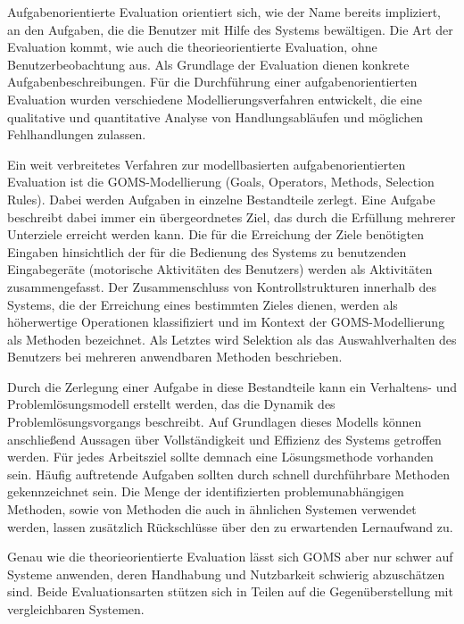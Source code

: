 Aufgabenorientierte Evaluation orientiert sich, wie der Name bereits impliziert, an den Aufgaben, die die Benutzer mit Hilfe des Systems bewältigen. Die Art der Evaluation kommt, wie auch die theorieorientierte Evaluation, ohne Benutzerbeobachtung aus. Als Grundlage der Evaluation dienen konkrete Aufgabenbeschreibungen. Für die Durchführung einer aufgabenorientierten Evaluation wurden verschiedene Modellierungsverfahren entwickelt, die eine qualitative und quantitative Analyse von Handlungsabläufen und möglichen Fehlhandlungen zulassen. \parencite[vgl.][209]{Herczeg2009}

Ein weit verbreitetes Verfahren zur modellbasierten aufgabenorientierten Evaluation ist die GOMS-Modellierung (Goals, Operators, Methods, Selection Rules). Dabei werden Aufgaben in einzelne Bestandteile zerlegt. Eine Aufgabe beschreibt dabei immer ein übergeordnetes Ziel, das durch die Erfüllung mehrerer Unterziele erreicht werden kann. Die für die Erreichung der Ziele benötigten Eingaben hinsichtlich der für die Bedienung des Systems zu benutzenden Eingabegeräte (motorische Aktivitäten des Benutzers) werden als Aktivitäten zusammengefasst. Der Zusammenschluss von Kontrollstrukturen innerhalb des Systems, die der Erreichung eines bestimmten Zieles dienen, werden als höherwertige Operationen klassifiziert und im Kontext der GOMS-Modellierung als Methoden bezeichnet. Als Letztes wird Selektion als das Auswahlverhalten des Benutzers bei mehreren anwendbaren Methoden beschrieben. \parencite[vgl.][209]{Herczeg2009}

Durch die Zerlegung einer Aufgabe in diese Bestandteile kann ein Verhaltens- und Problemlösungsmodell erstellt werden, das die Dynamik des Problemlösungsvorgangs beschreibt. Auf Grundlagen dieses Modells können anschließend Aussagen über Vollständigkeit und Effizienz des Systems getroffen werden. Für jedes Arbeitsziel sollte demnach eine Lösungsmethode vorhanden sein. Häufig auftretende Aufgaben sollten durch schnell durchführbare Methoden gekennzeichnet sein. Die Menge der identifizierten problemunabhängigen Methoden, sowie von Methoden die auch in ähnlichen Systemen verwendet werden, lassen zusätzlich Rückschlüsse über den zu erwartenden Lernaufwand zu. \parencite[vgl.][210]{Herczeg2009}

Genau wie die theorieorientierte Evaluation lässt sich GOMS aber nur schwer auf Systeme anwenden, deren Handhabung und Nutzbarkeit schwierig abzuschätzen sind. Beide Evaluationsarten stützen sich in Teilen auf die Gegenüberstellung mit vergleichbaren Systemen. 

